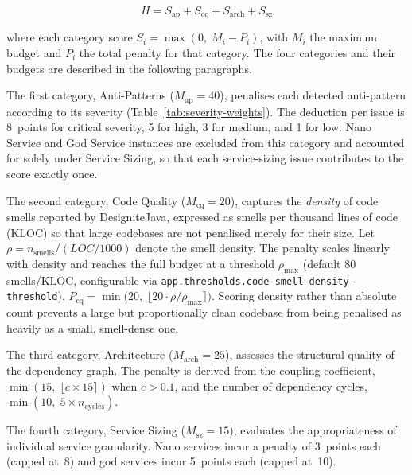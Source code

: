\begin{equation}
    H = S_{\mathrm{ap}} + S_{\mathrm{cq}} + S_{\mathrm{arch}} + S_{\mathrm{sz}}
    \label{eq:health-score}
\end{equation}

\noindent where each category score $S_i = \max(0,\; M_i - P_i)$, with $M_i$ the maximum budget and $P_i$ the total penalty for that category. The four categories and their budgets are described in the following paragraphs.

\par The first category, Anti-Patterns ($M_{\mathrm{ap}} = 40$), penalises each detected anti-pattern according to its severity (Table~\ref{tab:severity-weights}). The deduction per issue is 8~points for critical severity, 5 for high, 3 for medium, and 1 for low. Nano Service and God Service instances are excluded from this category and accounted for solely under Service Sizing, so that each service-sizing issue contributes to the score exactly once.

\par The second category, Code Quality ($M_{\mathrm{cq}} = 20$), captures the \emph{density} of code smells reported by DesigniteJava, expressed as smells per thousand lines of code (KLOC) so that large codebases are not penalised merely for their size. Let $\rho = n_{\mathrm{smells}} / (\mathit{LOC}/1000)$ denote the smell density. The penalty scales linearly with density and reaches the full budget at a threshold $\rho_{\max}$ (default 80 smells/KLOC, configurable via \texttt{app.thresholds.code-smell-density-threshold}), $P_{\mathrm{cq}} = \min\bigl(20,\; \lfloor 20 \cdot \rho / \rho_{\max} \rceil\bigr)$. Scoring density rather than absolute count prevents a large but proportionally clean codebase from being penalised as heavily as a small, smell-dense one.

\par The third category, Architecture ($M_{\mathrm{arch}} = 25$), assesses the structural quality of the dependency graph. The penalty is derived from the coupling coefficient, $\min(15,\; \lfloor c \times 15 \rceil)$ when $c > 0.1$, and the number of dependency cycles, $\min(10,\; 5 \times n_{\mathrm{cycles}})$.

\par The fourth category, Service Sizing ($M_{\mathrm{sz}} = 15$), evaluates the appropriateness of individual service granularity. Nano services incur a penalty of 3~points each (capped at~8) and god services incur 5~points each (capped at~10).


